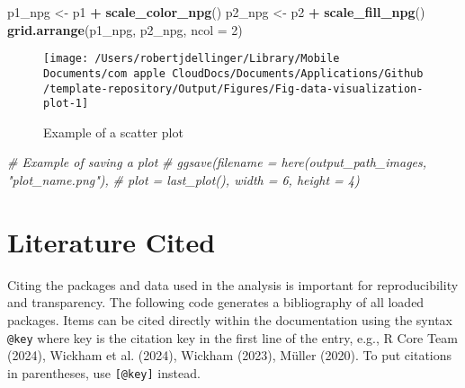 \documentclass[
  12pt,
]{article}
\newenvironment{Shaded}{\begin{snugshade}}{\end{snugshade}}
\newcommand{\AttributeTok}[1]{\textcolor[rgb]{0.13,0.29,0.53}{#1}}
\newcommand{\CommentTok}[1]{\textcolor[rgb]{0.56,0.35,0.01}{\textit{#1}}}
\newcommand{\DecValTok}[1]{\textcolor[rgb]{0.00,0.00,0.81}{#1}}
\newcommand{\FunctionTok}[1]{\textcolor[rgb]{0.13,0.29,0.53}{\textbf{#1}}}
\newcommand{\NormalTok}[1]{#1}
\newcommand{\OtherTok}[1]{\textcolor[rgb]{0.56,0.35,0.01}{#1}}
\newcommand{\SpecialCharTok}[1]{\textcolor[rgb]{0.81,0.36,0.00}{\textbf{#1}}}
\begin{document}
\begin{Shaded}
\begin{Highlighting}[]
\NormalTok{p1\_npg }\OtherTok{\textless{}{-}}\NormalTok{ p1 }\SpecialCharTok{+} \FunctionTok{scale\_color\_npg}\NormalTok{()}
\NormalTok{p2\_npg }\OtherTok{\textless{}{-}}\NormalTok{ p2 }\SpecialCharTok{+} \FunctionTok{scale\_fill\_npg}\NormalTok{()}
\FunctionTok{grid.arrange}\NormalTok{(p1\_npg, p2\_npg, }\AttributeTok{ncol =} \DecValTok{2}\NormalTok{)}
\end{Highlighting}
\end{Shaded}

\begin{figure}

{\centering \texttt{[image: /Users/robertjdellinger/Library/Mobile Documents/com~apple~CloudDocs/Documents/Applications/Github/template-repository/Output/Figures/Fig-data-visualization-plot-1]} 

}

\caption{Example of a scatter plot}\label{fig:data-visualization-plot}
\end{figure}

\begin{Shaded}
\begin{Highlighting}[]
\CommentTok{\# Example of saving a plot}
\CommentTok{\# ggsave(filename = here(output\_path\_images, "plot\_name.png"),}
\CommentTok{\# plot = last\_plot(), width = 6, height = 4)}
\end{Highlighting}
\end{Shaded}

\section{Literature Cited}\label{literature-cited}

Citing the packages and data used in the analysis is important for
reproducibility and transparency. The following code generates a
bibliography of all loaded packages. Items can be cited directly within
the documentation using the syntax \texttt{@key} where key is the
citation key in the first line of the entry, e.g., R Core Team (2024),
Wickham et al. (2024), Wickham (2023), Müller (2020). To put citations
in parentheses, use \texttt{{[}@key{]}} instead.
\end{document}
